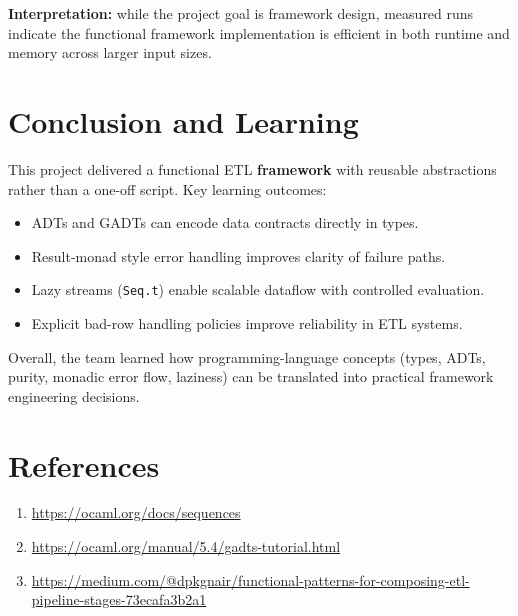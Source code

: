 \documentclass[11pt,a4paper]{article}
\begin{document}
\textbf{Interpretation:} while the project goal is framework design, measured runs indicate the functional framework implementation is efficient in both runtime and memory across larger input sizes.

\section{Conclusion and Learning}
This project delivered a functional ETL \textbf{framework} with reusable abstractions rather than a one-off script. Key learning outcomes:
\begin{itemize}
  \item ADTs and GADTs can encode data contracts directly in types.
  \item Result-monad style error handling improves clarity of failure paths.
  \item Lazy streams (\texttt{Seq.t}) enable scalable dataflow with controlled evaluation.
  \item Explicit bad-row handling policies improve reliability in ETL systems.
\end{itemize}
Overall, the team learned how programming-language concepts (types, ADTs, purity, monadic error flow, laziness) can be translated into practical framework engineering decisions.

\section*{References}
\begin{enumerate}
  \item \url{https://ocaml.org/docs/sequences}
  \item \url{https://ocaml.org/manual/5.4/gadts-tutorial.html}
  \item \url{https://medium.com/@dpkgnair/functional-patterns-for-composing-etl-pipeline-stages-73ecafa3b2a1}
\end{enumerate}
\end{document}
